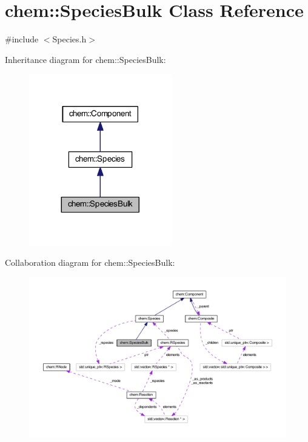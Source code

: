 \hypertarget{classchem_1_1SpeciesBulk}{\section{chem\-:\-:Species\-Bulk Class Reference}
\label{classchem_1_1SpeciesBulk}
}


{\ttfamily \#include $<$Species.\-h$>$}



Inheritance diagram for chem\-:\-:Species\-Bulk\-:\nopagebreak
\begin{figure}[H]
\begin{center}
\leavevmode
\includegraphics[width=176pt]{classchem_1_1SpeciesBulk__inherit__graph}
\end{center}
\end{figure}


Collaboration diagram for chem\-:\-:Species\-Bulk\-:\nopagebreak
\begin{figure}[H]
\begin{center}
\leavevmode
\includegraphics[width=350pt]{classchem_1_1SpeciesBulk__coll__graph}
\end{center}
\end{figure}

